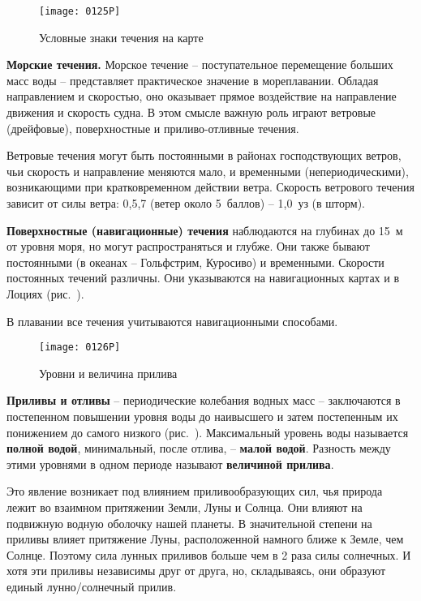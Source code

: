 \begin{figure}[!htb]
  \centering{}
  \texttt{[image: 0125P]}
  \caption{Условные знаки течения на карте}
  \label{fig:125}
\end{figure}

\textbf{Морские течения.} Морское течение \---
поступательное перемещение больших масс воды \--- представляет
практическое значение в мореплавании. Обладая направлением и
скоростью, оно оказывает прямое воздействие на направление движения и
скорость судна. В этом смысле важную роль играют ветровые (дрейфовые),
поверхностные и приливо-отливные течения.

Ветровые течения могут быть постоянными в районах господствующих
ветров, чьи скорость и направление меняются мало, и временными
(непериодическими), возникающими при кратковременном действии
ветра. Скорость ветрового течения зависит от силы ветра: 0,5,7
(ветер около 5~баллов) \--- 1,0~уз (в шторм).

\textbf{Поверхностные (навигационные) течения} наблюдаются на глубинах
до 15~м от уровня моря, но могут распространяться и глубже. Они также
бывают постоянными (в океанах \--- Гольфстрим,
Куросиво) и
временными. Скорости постоянных течений различны. Они указываются на
навигационных картах и в Лоциях (рис.~).

В плавании все течения учитываются навигационными способами.

\begin{figure}[!htb]
  \centering{}
  \texttt{[image: 0126P]}
  \caption{Уровни и величина прилива}
  \label{fig:126}
\end{figure}

\textbf{Приливы и отливы} \---
периодические колебания водных масс \--- заключаются в постепенном
повышении уровня воды до наивысшего и затем постепенным их понижением
до самого низкого (рис.~). Максимальный уровень воды
называется \textbf{полной водой},
минимальный, после отлива, \--- \textbf{малой водой}.
Разность между этими уровнями в одном периоде называют
\textbf{величиной прилива}.

Это явление возникает под влиянием приливообразующих сил, чья природа
лежит во взаимном притяжении Земли, Луны и Солнца. Они влияют на
подвижную водную оболочку нашей планеты. В значительной степени на
приливы влияет притяжение Луны, расположенной намного ближе к Земле,
чем Солнце. Поэтому сила лунных приливов больше чем в 2 раза силы
солнечных. И хотя эти приливы независимы друг от друга, но,
складываясь, они образуют единый лунно\-/солнечный прилив.

